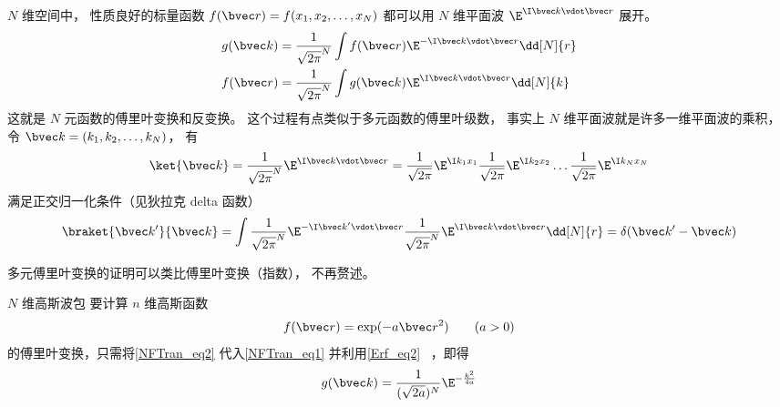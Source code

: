 

$N$ 维空间中， 性质良好的标量函数 $f(\bvec r) = f(x_1, x_2, \dots, x_N)$ 都可以用 $N$ 维平面波 $\E^{\I \bvec k\vdot \bvec r}$ 展开。
\begin{align}
g(\bvec k) &= \frac{1}{\sqrt{2\pi}^N} \int f(\bvec r) \E^{-\I \bvec k \vdot \bvec r} \dd[N]{r}\label{NFTran_eq1}\\
f(\bvec r) &= \frac{1}{\sqrt{2\pi}^N} \int g(\bvec k) \E^{\I \bvec k \vdot \bvec r} \dd[N]{k}
\end{align}
这就是 $N$ 元函数的傅里叶变换和反变换。 这个过程有点类似于多元函数的傅里叶级数， 事实上 $N$ 维平面波就是许多一维平面波的乘积， 令 $\bvec k = (k_1, k_2, \dots, k_N)$， 有
\begin{equation}
\ket{\bvec k} = \frac{1}{\sqrt{2\pi}^N}\E^{\I \bvec k \vdot \bvec r} = \frac{1}{\sqrt{2\pi}} \E^{\I k_1 x_1} \frac{1}{\sqrt{2\pi}} \E^{\I k_2 x_2} \dots \frac{1}{\sqrt{2\pi}} \E^{\I k_N x_N}
\end{equation}
满足正交归一化条件（见狄拉克 delta 函数）
\begin{equation}
\braket{\bvec k'}{\bvec k} = \int \frac{1}{\sqrt{2\pi}^N}\E^{-\I \bvec k' \vdot \bvec r} \frac{1}{\sqrt{2\pi}^N}\E^{\I \bvec k \vdot \bvec r} \dd[N]{r} = \delta(\bvec k'- \bvec k)
\end{equation}

多元傅里叶变换的证明可以类比傅里叶变换（指数）， 不再赘述。

\begin{example}{$N$ 维高斯波包}
要计算 $n$ 维高斯函数
\begin{equation}\label{NFTran_eq2}
f(\bvec r) = \exp(-a\bvec r^2) \qquad (a > 0)
\end{equation}
的傅里叶变换，只需将\autoref{NFTran_eq2} 代入\autoref{NFTran_eq1} 并利用\autoref{Erf_eq2}~ ，即得
\begin{equation}
g(\bvec k) = \frac{1}{(\sqrt{2a})^N}\E^{-\frac{k^2}{4a}}
\end{equation}
\end{example}
